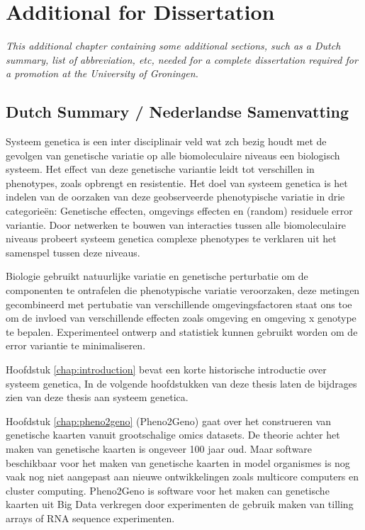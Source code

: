\chapter{Additional for Dissertation}
\thispagestyle{empty}
\emph{This additional chapter containing some additional sections, such as a Dutch summary, 
list of abbreviation, etc, needed for a complete dissertation required for a promotion at 
the University of Groningen.}
\null
\vfill
\newpage

\section{Dutch Summary / Nederlandse Samenvatting}
Systeem genetica is een inter disciplinair veld wat zch bezig houdt met de gevolgen van 
genetische variatie op alle biomoleculaire niveaus een biologisch systeem. Het effect van 
deze genetische variantie leidt tot verschillen in phenotypes, zoals opbrengt en resistentie. 
Het doel van systeem genetica is het indelen van de oorzaken van deze geobserveerde 
phenotypische variatie in drie categorie\"en: Genetische effecten, omgevings effecten en 
(random) residuele error variantie. Door netwerken te bouwen van interacties tussen 
alle biomoleculaire niveaus probeert systeem genetica complexe phenotypes te verklaren uit 
het samenspel tussen deze niveaus.

Biologie gebruikt natuurlijke variatie en genetische perturbatie om de componenten te ontrafelen
die phenotypische variatie veroorzaken, deze metingen gecombineerd met pertubatie van verschillende 
omgevingsfactoren staat ons toe om de invloed van verschillende effecten zoals omgeving en 
omgeving x genotype te bepalen. Experimenteel ontwerp and statistiek kunnen gebruikt worden om 
de error variantie te minimaliseren.

Hoofdstuk \ref{chap:introduction} bevat een korte historische introductie over systeem genetica, 
In de volgende hoofdstukken van deze thesis laten de bijdrages zien van deze thesis aan systeem genetica.

Hoofdstuk \ref{chap:pheno2geno} (Pheno2Geno) gaat over het construeren van genetische kaarten vanuit grootschalige 
omics datasets. De theorie achter het maken van genetische kaarten is ongeveer 100 jaar oud. Maar 
software beschikbaar voor het maken van genetische kaarten in model organismes is nog 
vaak nog niet aangepast aan nieuwe ontwikkelingen zoals multicore computers en cluster computing. 
Pheno2Geno is software voor het maken can genetische kaarten uit Big Data verkregen door 
experimenten de gebruik maken van tilling arrays of RNA sequence experimenten.

